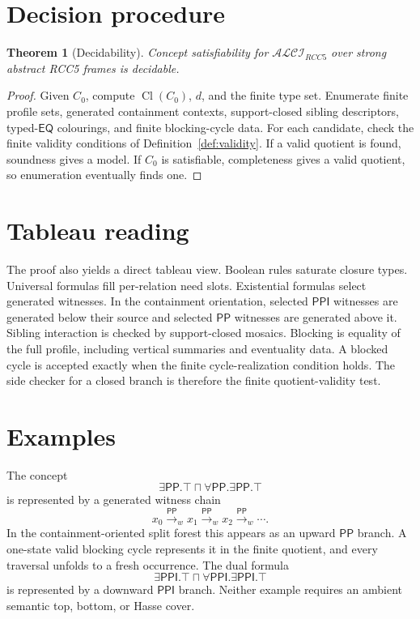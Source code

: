 \documentclass[11pt]{article}
\newtheorem{theorem}[definition]{Theorem}
\theoremstyle{remark}
\newcommand{\PP}{\mathsf{PP}}
\newcommand{\PPI}{\mathsf{PPI}}
\newcommand{\EQ}{\mathsf{EQ}}
\newcommand{\Cl}{\operatorname{Cl}}
\begin{document}
\section{Decision procedure}
\begin{theorem}[Decidability]\label{thm:decidability}
Concept satisfiability for $\mathcal{ALCI}_{RCC5}$ over strong abstract RCC5 frames is decidable.
\end{theorem}
\begin{proof}
Given $C_0$, compute $\Cl(C_0)$, $d$, and the finite type set.  Enumerate finite profile sets, generated containment contexts, support-closed sibling descriptors, typed-$\EQ$ colourings, and finite blocking-cycle data.  For each candidate, check the finite validity conditions of Definition~\ref{def:validity}.  If a valid quotient is found, soundness gives a model.  If $C_0$ is satisfiable, completeness gives a valid quotient, so enumeration eventually finds one.
\end{proof}

\section{Tableau reading}
The proof also yields a direct tableau view.  Boolean rules saturate closure types.  Universal formulas fill per-relation need slots.  Existential formulas select generated witnesses.  In the containment orientation, selected $\PPI$ witnesses are generated below their source and selected $\PP$ witnesses are generated above it.  Sibling interaction is checked by support-closed mosaics.  Blocking is equality of the full profile, including vertical summaries and eventuality data.  A blocked cycle is accepted exactly when the finite cycle-realization condition holds.  The side checker for a closed branch is therefore the finite quotient-validity test.

\section{Examples}
The concept
\[
\exists\PP.\top\sqcap\forall\PP.\exists\PP.\top
\]
is represented by a generated witness chain
\[
x_0\xrightarrow{\PP}_w x_1\xrightarrow{\PP}_w x_2\xrightarrow{\PP}_w\cdots.
\]
In the containment-oriented split forest this appears as an upward $\PP$ branch.  A one-state valid blocking cycle represents it in the finite quotient, and every traversal unfolds to a fresh occurrence.  The dual formula
\[
\exists\PPI.\top\sqcap\forall\PPI.\exists\PPI.\top
\]
is represented by a downward $\PPI$ branch.  Neither example requires an ambient semantic top, bottom, or Hasse cover.
\end{document}
